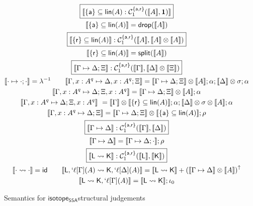 \documentclass[acmsmall,screen,review]{acmart}
\newcommand{\mc}[1]{\ensuremath{\mathcal{#1}}}
\newcommand{\mb}[1]{\ensuremath{\mathbf{#1}}}
\newcommand{\ms}[1]{\ensuremath{\mathsf{#1}}}
\newcommand{\lbl}[1]{{`#1}}
\newcommand{\csplits}[3]{#1 \mapsto #2;#3}
\newcommand{\cwk}[2]{#1 \mapsto #2}
\newcommand{\lwk}[2]{#1 \rightsquigarrow #2}
\newcommand{\tlin}[2]{#2 \subseteq \ms{lin}(#1)}
\newcommand{\thyp}[3]{#1: {#2}^{#3}}
\newcommand{\lhyp}[3]{#1[#2](#3)}
\newcommand{\llhyp}[3]{\lhyp{\lbl{#1}}{#2}{#3}}
\newcommand{\taff}{{\{\ms{a}\}}}
\newcommand{\trel}{{\{\ms{r}\}}}
\newcommand{\tint}{{\{\ms{a}, \ms{r}\}}}
\newcommand{\dnt}[1]{\llbracket{#1}\rrbracket}
\newcommand{\upg}[2]{{#1}^{\uparrow #2}}
\newcommand{\isotopessa}{\ms{isotope_{SSA}}}
\begin{document}
\begin{figure}
  \begin{gather*}
    \boxed{\dnt{\tlin{A}{\taff}: \mc{C}_1^\tint(\dnt{A}, \mb{1})}}
      \\
      \dnt{\tlin{A}{\taff}} = \ms{drop}(\dnt{A})
      \\
    \boxed{\dnt{\tlin{A}{\trel}}
      : \mc{C}_1^\tint(\dnt{A}, \dnt{A} \otimes \dnt{A})}
      \\
      \dnt{\tlin{A}{\trel}} = \ms{split}(\dnt{A})
      \\
    \boxed{\dnt{\csplits{\Gamma}{\Delta}{\Xi}}
      : \mc{C}_1^\tint(\dnt{\Gamma}, \dnt{\Delta} \otimes \dnt{\Xi})}
      \\
    \dnt{\csplits{\cdot}{\cdot}{\cdot}} = \lambda^{-1} \qquad
    \dnt{\csplits
      {\Gamma, \thyp{x}{A}{q}}
      {\Delta, \thyp{x}{A}{q}}
      {\Xi}} 
      = \dnt{\csplits{\Gamma}{\Delta}{\Xi}} \otimes \dnt{A};\alpha;\dnt{\Delta} \otimes \sigma;\alpha 
      \\
    \dnt{\csplits
      {\Gamma, \thyp{x}{A}{q}}
      {\Delta}
      {\Xi, \thyp{x}{A}{q}}} 
      = \dnt{\csplits{\Gamma}{\Delta}{\Xi}} \otimes \dnt{A};\alpha 
      \\
    \dnt{\csplits
      {\Gamma, \thyp{x}{A}{q}}
      {\Delta}
      {\Xi, \thyp{x}{A}{q}}} \
      = \dnt{\Gamma} \otimes \dnt{\tlin{A}{\trel}};
        \alpha;
        \dnt{\Delta} \otimes \sigma \otimes \dnt{A};
        \alpha 
        \\
    \dnt{\csplits
      {\Gamma, \thyp{x}{A}{q}}
      {\Delta}
      {\Xi}}
      = \dnt{\csplits{\Gamma}{\Delta}{\Xi}}
        \otimes \dnt{\tlin{A}{\taff}}
      ; \rho 
      \\
    \boxed{\dnt{\cwk{\Gamma}{\Delta}}
      : \mc{C}_1^\tint(\dnt{\Gamma}, \dnt{\Delta})} 
      \\
      \dnt{\cwk{\Gamma}{\Delta}} 
      = \dnt{\csplits{\Gamma}{\Delta}{\cdot}};\rho 
      \\
    \boxed{\dnt{\lwk{\ms{L}}{\ms{K}}}
      : \mc{C}_1^\tint(\dnt{\ms{L}}, \dnt{\ms{K}})} 
      \\
    \dnt{\lwk{\cdot}{\cdot}} = \ms{id} \qquad
    \dnt{\lwk
      {\ms{L}, \llhyp{\ell}{\Gamma}{A}}
      {\ms{K}, \llhyp{\ell}{\Delta}{A}}}
      = \dnt{\lwk{\ms{L}}{\ms{K}}} + \upg{(\dnt{\cwk{\Gamma}{\Delta}} \otimes \dnt{A})}{} 
      \\
    \dnt{\lwk{\ms{L}}{\ms{K}, \llhyp{\ell}{\Gamma}{A}}}
      = \dnt{\lwk{\ms{L}}{\ms{K}}};\iota_0
  \end{gather*}
  \caption{Semantics for \isotopessa structural judgements}
  \label{fig:ssa-structural-semantics}
\end{figure}
\end{document}
